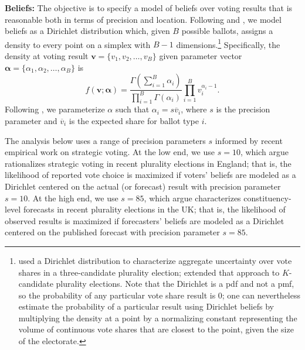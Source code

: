 \documentclass[11pt,a4paper]{article}
\begin{document}
\noindent \textbf{Beliefs:} The objective is to specify a model of beliefs over voting results that is reasonable both in terms of precision and location. Following \citet{fisher2017strategic} and \citet{eggersvotes}, we model beliefs as a Dirichlet distribution which, given $B$ possible ballots, assigns a density to every point on a simplex with $B-1$ dimensions.\footnote{\citet{fisher2017strategic} used a Dirichlet distribution to characterize aggregate uncertainty over vote shares in a three-candidate plurality election; \citet{eggersvotes} extended that approach to $K$-candidate plurality elections. Note that the Dirichlet is a pdf and not a pmf, so the probability of any particular vote share result is 0; one can nevertheless estimate the probability of a particular result using Dirichlet beliefs by multiplying the density at a point by a normalizing constant representing the volume of continuous vote shares that are closest to the point, given the size of the electorate.} Specifically, the density at voting result $\mathbf{v} = \{v_1, v_2, \ldots, v_B\}$ given parameter vector $\mathbf{\alpha} = \{\alpha_1, \alpha_2, \ldots, \alpha_B\}$ is
\[
f(\mathbf{v}; \mathbf{\alpha}) = \frac{\Gamma \left( \sum_{i = 1}^B \alpha_i \right)}{\prod_{i = 1}^B \Gamma (\alpha_i)} \prod_{i=1}^B v_i^{\alpha_i - 1}.
\]
Following \citet{fisher2017strategic}, we parameterize $\alpha$ such that $\alpha_i = s \overline{v}_i$, where $s$ is the precision parameter and $\overline{v}_i$ is the expected share for ballot type $i$. %

The analysis below uses a range of precision parameters $s$ informed by recent empirical work on strategic voting. At the low end, we use $s = 10$, which \citet{fisher2017strategic} argue rationalizes strategic voting in recent plurality elections in England; that is, the likelihood of reported vote choice is maximized if voters' beliefs are modeled as a Dirichlet centered on the actual (or forecast) result with precision parameter $s = 10$. At the high end, we use $s = 85$, which \citet{eggersvotes} argue characterizes constituency-level forecasts in recent plurality elections in the UK; that is, the likelihood of observed results is maximized if forecasters' beliefs are modeled as a Dirichlet centered on the published forecast with precision parameter $s = 85$.  
\end{document}

